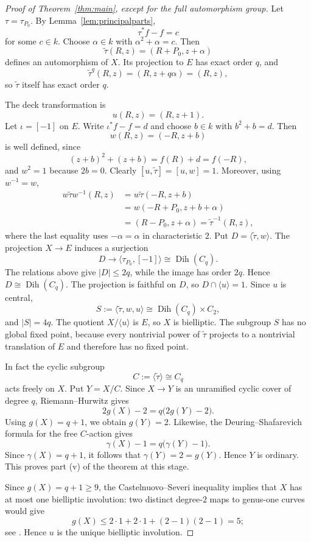 \documentclass[11pt]{article}
\theoremstyle{remark}
\newcommand{\Dih}{\operatorname{Dih}}
\begin{document}
\begin{proof}[Proof of Theorem~\ref{thm:main}, except for the full automorphism group]
Let $\tau=\tau_{P_0}$.  By Lemma~\ref{lem:principalparts},
\[
 \tau^*f-f=c
\]
for some $c\in k$.  Choose $\alpha\in k$ with $\alpha^2+\alpha=c$.  Then
\[
 \widetilde\tau(R,z)=(R+P_0,z+\alpha)
\]
defines an automorphism of $X$.  Its projection to $E$ has exact order
$q$, and
\[
 \widetilde\tau^q(R,z)=(R,z+q\alpha)=(R,z),
\]
so $\widetilde\tau$ itself has exact order $q$.

The deck transformation is
\[
 u(R,z)=(R,z+1).
\]
Let $\iota=[-1]$ on $E$.  Write $\iota^*f-f=d$ and choose $b\in k$ with
$b^2+b=d$.  Then
\[
 w(R,z)=(-R,z+b)
\]
is well defined, since
\[
 (z+b)^2+(z+b)=f(R)+d=f(-R),
\]
and $w^2=1$ because $2b=0$.  Clearly
$[u,\widetilde\tau]=[u,w]=1$.  Moreover, using $w^{-1}=w$,
\[
\begin{aligned}
 w\widetilde\tau w^{-1}(R,z)
 &=w\widetilde\tau(-R,z+b)\\
 &=w(-R+P_0,z+b+\alpha)\\
 &=(R-P_0,z+\alpha)
 =\widetilde\tau^{-1}(R,z),
\end{aligned}
\]
where the last equality uses $-\alpha=\alpha$ in characteristic $2$.
Put $D=\langle\widetilde\tau,w\rangle$.  The projection $X\to E$
induces a surjection
\[
        D\longrightarrow
        \langle\tau_{P_0},[-1]\rangle\cong\Dih(C_q).
\]
The relations above give $|D|\le2q$, while the image has order $2q$.
Hence $D\cong\Dih(C_q)$.  The projection is faithful on $D$, so
$D\cap\langle u\rangle=1$.  Since $u$ is central,
\[
        S:=\langle\widetilde\tau,w,u\rangle
        \cong\Dih(C_q)\times C_2,
\]
and $|S|=4q$.  The quotient $X/\langle u\rangle$ is $E$, so $X$ is
bielliptic.  The subgroup $S$ has no global fixed point, because every
nontrivial power of $\widetilde\tau$ projects to a nontrivial translation
of $E$ and therefore has no fixed point.

In fact the cyclic subgroup
\[
 C:=\langle\widetilde\tau\rangle\cong C_q
\]
acts freely on $X$.  Put $Y=X/C$.  Since $X\to Y$ is an unramified cyclic
cover of degree $q$, Riemann--Hurwitz gives
\[
 2g(X)-2=q\bigl(2g(Y)-2\bigr).
\]
Using $g(X)=q+1$, we obtain $g(Y)=2$.  Likewise, the
Deuring--Shafarevich formula for the free $C$-action gives
\[
 \gamma(X)-1=q\bigl(\gamma(Y)-1\bigr).
\]
Since $\gamma(X)=q+1$, it follows that $\gamma(Y)=2=g(Y)$.  Hence $Y$ is
ordinary.  This proves part \textup{(v)} of the theorem at this stage.

Since $g(X)=q+1\ge9$, the Castelnuovo--Severi inequality implies that $X$
has at most one bielliptic involution: two distinct degree-$2$ maps to
genus-one curves would give
\[
 g(X)\le 2\cdot1+2\cdot1+(2-1)(2-1)=5;
\]
see \cite[Theorem~III.10.3]{Stichtenoth}.  Hence $u$ is the unique
bielliptic involution.
\end{proof}
\end{document}

